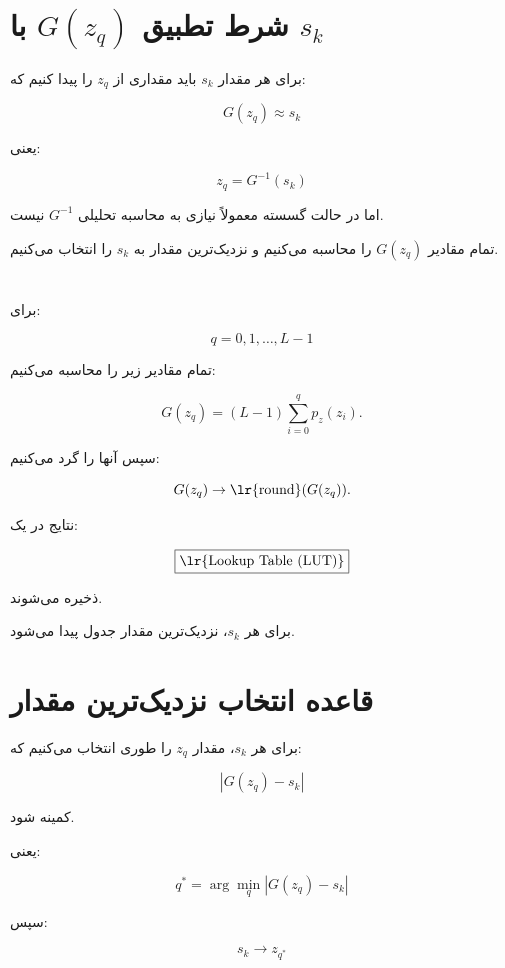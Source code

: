 \documentclass[12pt,a4paper]{article}
\begin{document}
	\section{شرط تطبیق $G(z_q)$ با $s_k$}
	
	برای هر مقدار $s_k$ باید مقداری از $z_q$ را پیدا کنیم که:
	
	\[
	\boxed{
		G(z_q)\approx s_k
	}
	\tag{22}
	\]
	
	یعنی:
	
	\[
	\boxed{
		z_q=G^{-1}(s_k)
	}
	\tag{23}
	\]
	
	اما در حالت گسسته معمولاً نیازی به محاسبه تحلیلی $G^{-1}$ نیست.
	
	تمام مقادیر $G(z_q)$ را محاسبه می‌کنیم و نزدیک‌ترین مقدار به $s_k$
	را انتخاب می‌کنیم.
	
	
	\section{}
	
	برای:
	
	\[
	q=0,1,\ldots,L-1
	\]
	
	تمام مقادیر زیر را محاسبه می‌کنیم:
	
	\[
	G(z_q)
	=
	(L-1)
	\sum_{i=0}^{q}p_z(z_i).
	\]
	
	سپس آنها را گرد می‌کنیم:
	
	\[
	G(z_q)\rightarrow
	\text{\lr{round}}(G(z_q)).
	\]
	
	نتایج در یک:
	
	\[
	\boxed{\text{\lr{Lookup Table (LUT)}}}
	\]
	
	ذخیره می‌شوند.
	
	برای هر $s_k$، نزدیک‌ترین مقدار جدول پیدا می‌شود.
	
	
	\section{قاعده انتخاب نزدیک‌ترین مقدار}
	
	برای هر $s_k$، مقدار $z_q$ را طوری انتخاب می‌کنیم که:
	
	\[
	\boxed{
		|G(z_q)-s_k|
	}
	\]
	
	کمینه شود.
	
	یعنی:
	
	\[
	\boxed{
		q^*
		=
		\arg\min_q
		|G(z_q)-s_k|
	}
	\tag{24}
	\]
	
	سپس:
	
	\[
	\boxed{
		s_k\rightarrow z_{q^*}
	}
	\tag{25}
	\]
	
\end{document}
